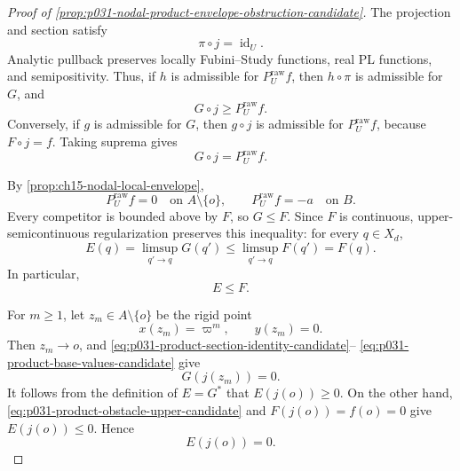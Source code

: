
\begin{proof}[Proof of
\cref{prop:p031-nodal-product-envelope-obstruction-candidate}]
The projection and section satisfy
\[
                         \pi\circ j=\operatorname{id}_U.
\]
Analytic pullback preserves locally Fubini--Study functions, real PL
functions, and semipositivity.  Thus, if \(h\) is admissible for
\(P_U^{\mathrm{raw}}f\), then \(h\circ\pi\) is admissible for \(G\), and
\[
                         G\circ j\geq P_U^{\mathrm{raw}}f.
\]
Conversely, if \(g\) is admissible for \(G\), then \(g\circ j\) is admissible
for \(P_U^{\mathrm{raw}}f\), because \(F\circ j=f\).  Taking suprema gives
\begin{equation}
\label{eq:p031-product-section-identity-candidate}
                 G\circ j=P_U^{\mathrm{raw}}f.
\end{equation}

By \cref{prop:ch15-nodal-local-envelope},
\begin{equation}
\label{eq:p031-product-base-values-candidate}
 P_U^{\mathrm{raw}}f=0\quad\text{on }A\setminus\{o\},
 \qquad
 P_U^{\mathrm{raw}}f=-a\quad\text{on }B.
\end{equation}
Every competitor is bounded above by \(F\), so \(G\leq F\).  Since \(F\) is
continuous, upper-semicontinuous regularization preserves this inequality:
for every \(q\in X_d\),
\[
 E(q)=\limsup_{q'\to q}G(q')
     \leq\limsup_{q'\to q}F(q')
     =F(q).
\]
In particular,
\begin{equation}
\label{eq:p031-product-obstacle-upper-candidate}
                              E\leq F.
\end{equation}

For \(m\geq1\), let \(z_m\in A\setminus\{o\}\) be the rigid point
\[
                       x(z_m)=\varpi^m,\qquad y(z_m)=0.
\]
Then \(z_m\to o\), and
\eqref{eq:p031-product-section-identity-candidate}--%
\eqref{eq:p031-product-base-values-candidate} give
\[
                          G(j(z_m))=0.
\]
It follows from the definition of \(E=G^*\) that \(E(j(o))\geq0\).
On the other hand, \eqref{eq:p031-product-obstacle-upper-candidate} and
\(F(j(o))=f(o)=0\) give \(E(j(o))\leq0\).  Hence
\begin{equation}
\label{eq:p031-product-node-value-candidate}
                              E(j(o))=0.
\end{equation}


\end{proof}
